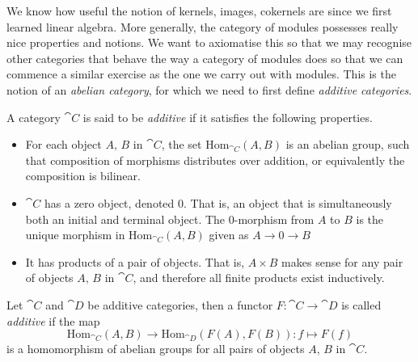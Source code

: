 \vspace*{1em}

\begin{discussion}
We know how useful the notion of kernels, images, cokernels are since we first learned linear algebra. More generally, the category of modules possesses really nice properties and notions. We want to axiomatise this so that we may recognise other categories that behave the way a category of modules does so that we can commence a similar exercise as the one we carry out with modules. This is the notion of an \emph{abelian category}, for which we need to first define \emph{additive categories}.
\end{discussion}

\vspace*{0.1in}

\begin{definition}
A category $\cat{C}$ is said to be \emph{additive} if it satisfies the following properties.
\begin{itemize}
\item For each object $A,\,B$ in $\cat{C}$, the set $\mathrm{Hom}_{\cat{C}}(A,B)$ is an abelian group, such that composition of morphisms distributes over addition, or equivalently the composition is bilinear.
\item $\cat{C}$ has a zero object, denoted $0$. That is, an object that is simultaneously both an initial and terminal object. The $0$-morphism from $A$ to $B$ is the unique morphism in $\mathrm{Hom}_{\cat{C}}(A,B)$ given as $A \to 0 \to B$
\item It has products of a pair of objects. That is, $A \times B$ makes sense for any pair of objects $A,\,B$ in $\cat{C}$, and therefore all finite products exist inductively.
\end{itemize}
\end{definition}

\vspace*{0.1in}

\begin{definition}
Let $\cat{C}$ and $\cat{D}$ be additive categories, then a functor $F:\cat{C} \to \cat{D}$ is called \emph{additive} if the map
\[\mathrm{Hom}_{\cat{C}}(A,B) \to \mathrm{Hom}_{\cat{D}}(F(A),F(B)):f \mapsto F(f)\]
is a homomorphism of abelian groups for all pairs of objects $A,\,B$ in $\cat{C}$.
\end{definition}

\vspace*{0.1in}

